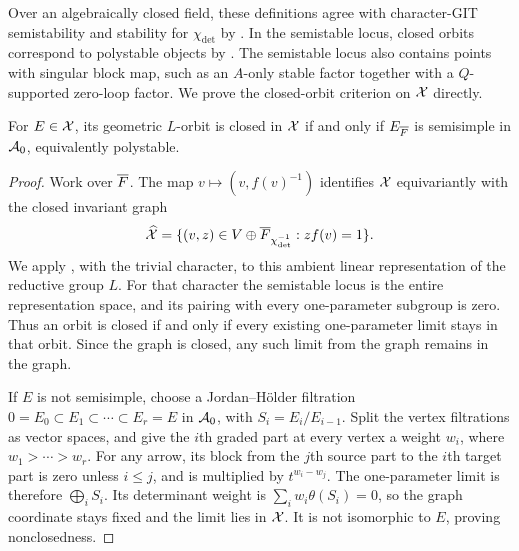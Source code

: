 Over an algebraically closed field, these definitions agree with
character-GIT semistability and stability for $\chi_{\det}$ by
\cite[Proposition~3.1]{King94}. In the semistable locus, closed orbits
correspond to polystable objects by \cite[Proposition~3.2]{King94}.
The semistable locus also contains points with singular block map,
such as an $A$-only stable factor together with a $Q$-supported
zero-loop factor. We prove the closed-orbit criterion on $\mathcal X$ directly.

\begin{proposition}
\label{m1:prop:polystability}
For $E\in\mathcal X$, its geometric $L$-orbit is closed in $\mathcal X$ if and only if
$E_{\overline F}$ is semisimple in $\mathcal A_0$, equivalently polystable.
\end{proposition}
\begin{proof}
Work over $\overline F$. The map $v\mapsto(v,f(v)^{-1})$ identifies $\mathcal X$
equivariantly with the closed invariant graph
\begin{equation}\label{m1:eq:closed-graph}
 \widehat{\mathcal X}=\{(v,z)\in V\oplus\overline F_{\chi_{\det}^{-1}}:zf(v)=1\}.
\end{equation}
We apply \cite[Proposition~2.6(i)]{King94}, with the trivial character,
to this ambient linear representation of the reductive group $L$.
For that character the semistable locus is the entire representation
space, and its pairing with every one-parameter subgroup is zero.
Thus an orbit is closed if and only if every existing one-parameter
limit stays in that orbit. Since the graph is closed, any such limit
from the graph remains in the graph.

If $E$ is not semisimple, choose a Jordan--H\"older filtration
$0=E_0\subset E_1\subset\cdots\subset E_r=E$ in $\mathcal A_0$, with
$S_i=E_i/E_{i-1}$. Split the vertex filtrations as vector spaces, and
give the $i$th graded part at every vertex a weight $w_i$, where
$w_1>\cdots>w_r$. For any arrow, its block from the $j$th source part
to the $i$th target part is zero unless $i\leq j$, and is multiplied by
$t^{w_i-w_j}$. The one-parameter limit is therefore $\bigoplus_i S_i$.
Its determinant weight is
$\sum_i w_i\theta(S_i)=0$, so the graph coordinate stays fixed and the
limit lies in $\mathcal X$. It is not isomorphic to $E$, proving nonclosedness.


\end{proof}
